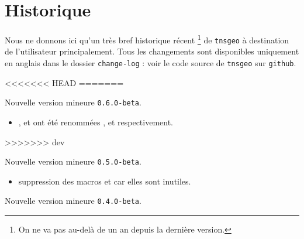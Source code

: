 \documentclass[12pt,a4paper]{article}
\begin{document}
\newpage

\section{Historique}

Nous ne donnons ici qu'un très bref historique récent
\footnote{
	On ne va pas au-delà de un an depuis la dernière version.
}
de \verb+tnsgeo+ à destination de l'utilisateur principalement.
Tous les changements sont disponibles uniquement en anglais dans le dossier \verb+change-log+ : voir le code source de \verb+tnsgeo+ sur \verb+github+.

\begin{description}

    \medskip
<<<<<<< HEAD
=======
    \item[2021-03-03] Nouvelle version mineure \verb+0.6.0-beta+.
    
    \begin{itemize}[itemsep=.5em]
        \item {}
              ,
              et
              ont été renommées
              ,
              et
              respectivement.
    
    
    \end{itemize}
    
    \separation
    


    \medskip
>>>>>>> dev
    \item[2021-02-26] Nouvelle version mineure \verb+0.5.0-beta+.
    
    \begin{itemize}[itemsep=.5em]
        \item {}
              suppression des macros  et  car elles sont inutiles.
    
    
    \end{itemize}
    
    \separation
    


    \medskip
    \item[2020-09-02] Nouvelle version mineure \verb+0.4.0-beta+.
    

\end{description}
\end{document}
